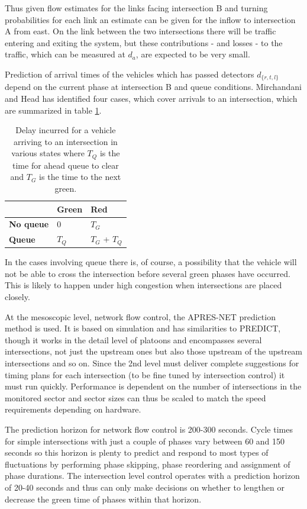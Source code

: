 Thus given flow estimates for the links facing intersection B and turning probabilities for each link an estimate can be given for the inflow to intersection A from east. On the link between the two intersections there will be traffic entering and exiting the system, but these contributions - and losses - to the traffic, which can be measured at $d_a$, are expected to be very small.

Prediction of arrival times of the vehicles which has passed detectors $d_{\lbrace r,t,l \rbrace}$ depend on the current phase at intersection B and queue conditions. Mirchandani and Head has identified four cases, which cover arrivals to an intersection, which are summarized in table \ref{tbl:delaycases}.

\begin{table}[!ht]
\begin{center}
\begin{tabular}{l|ll}
 & \textbf{Green} & \textbf{Red} \\ \hline
\textbf{No queue} & 0 & $T_G$ \\
\textbf{Queue} & $T_Q$ & $T_G$ + $T_Q$
\end{tabular}
\end{center}
\caption{Delay incurred for a vehicle arriving to an intersection in various states where $T_Q$ is the time for ahead queue to clear and $T_G$ is the time to the next green.}
\label{tbl:delaycases}
\end{table}

In the cases involving queue there is, of course, a possibility that the vehicle will not be able to cross the intersection before several green phases have occurred. This is likely to happen under high congestion when intersections are placed closely.

At the mesoscopic level, network flow control, the APRES-NET prediction method is used. It is based on simulation and has similarities to PREDICT, though it works in the detail level of platoons and encompasses several intersections, not just the upstream ones but also those upstream of the upstream intersections and so on. Since the 2nd level must deliver complete suggestions for timing plans for each intersection (to be fine tuned by intersection control) it must run quickly. Performance is dependent on the number of intersections in the monitored sector and sector sizes can thus be scaled to match the speed requirements depending on hardware.

The prediction horizon for network flow control is 200-300 seconds. Cycle times for simple intersections with just a couple of phases vary between 60 and 150 seconds so this horizon is plenty to predict and respond to most types of fluctuations by performing phase skipping, phase reordering and assignment of phase durations. The intersection level control operates with a prediction horizon of 20-40 seconds and thus can only make decisions on whether to lengthen or decrease the green time of phases within that horizon.

